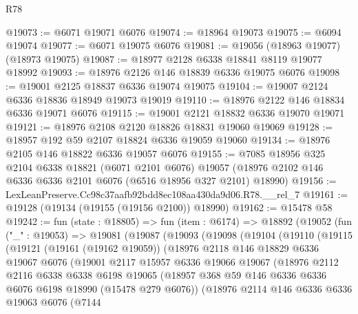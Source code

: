 \begin{lexlean}{R78}
\begin{coremodule}
@19073 := @6071 @19071 @6076
@19074 := @18964 @19073
@19075 := @6094 @19074
@19077 := @6071 @19075 @6076
@19081 := @19056 (@18963 @19077) (@18973 @19075)
@19087 := @18977 @2128 @6338 @18841 @8119 @19077 @18992
@19093 := @18976 @2126 @146 @18839 @6336 @19075 @6076
@19098 := @19001 @2125 @18837 @6336 @19074 @19075
@19104 := @19007 @2124 @6336 @18836 @18949 @19073 @19019
@19110 := @18976 @2122 @146 @18834 @6336 @19071 @6076
@19115 := @19001 @2121 @18832 @6336 @19070 @19071
@19121 := @18976 @2108 @2120 @18826 @18831 @19060 @19069
@19128 := @18957 @192 @59 @2107 @18824 @6336 @19059 @19060
@19134 := @18976 @2105 @146 @18822 @6336 @19057 @6076
@19155 := @7085
    @18956
    @325
    @2104
    @6338
    @18821
    (@6071 @2101 @6076)
    @19057
    (@18976 @2102 @146 @6336 @6336 @2101 @6076 (@6516 @18956 @327 @2101) @18990)
@19156 := LexLeanPreserve.Cc98c37aafb92bdd8ec108aa430da9d06.R78.__rel_7
@19161 := @19128 (@19134 (@19155 (@19156 @2100)) @18990)
@19162 := @15478 @58
@19242 := fun (state : @18805) =>
  fun (item : @6174) =>
  @18892
    (@19052
      (fun ("_" : @19053) =>
      @19081
        (@19087
          (@19093
            (@19098
              (@19104
                (@19110
                  (@19115
                    (@19121
                      (@19161 (@19162 @19059))
                      (@18976
                        @2118
                        @146
                        @18829
                        @6336
                        @19067
                        @6076
                        (@19001
                          @2117
                          @15957
                          @6336
                          @19066
                          @19067
                          (@18976
                            @2112
                            @2116
                            @6338
                            @6338
                            @6198
                            @19065
                            (@18957
                              @368
                              @59
                              @146
                              @6336
                              @6336
                              @6076
                              @6198
                              @18990
                              (@15478 @279 @6076))
                            (@18976
                              @2114
                              @146
                              @6336
                              @6336
                              @19063
                              @6076
                              (@7144

\end{coremodule}
\end{lexlean}
